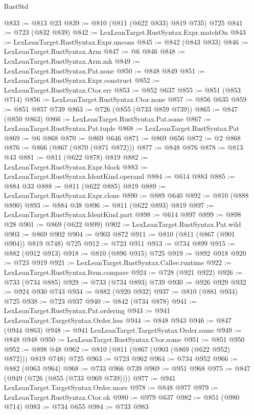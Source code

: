\begin{lexlean}{RustStd}
\begin{coremodule}
@833 := @813 @23
@839 := @810 (@811 (@622 @833) @819 @735) @725
@841 := @723 (@832 @839)
@842 := LexLeanTarget.RustSyntax.Expr.matchOn
@843 := LexLeanTarget.RustSyntax.Expr.uncons
@845 := @842 (@843 @833)
@846 := LexLeanTarget.RustSyntax.Arm
@847 := @6 @846
@848 := LexLeanTarget.RustSyntax.Arm.mk
@849 := LexLeanTarget.RustSyntax.Pat.none
@850 := @848 @849
@851 := LexLeanTarget.RustSyntax.Expr.construct
@852 := LexLeanTarget.RustSyntax.Ctor.err
@853 := @852 @637
@855 := @851 (@853 @714)
@856 := LexLeanTarget.RustSyntax.Ctor.none
@857 := @856 @635
@859 := @851 @857 @739
@863 := @726 (@855 (@733 @859 @739))
@865 := @847 (@850 @863)
@866 := LexLeanTarget.RustSyntax.Pat.some
@867 := LexLeanTarget.RustSyntax.Pat.tuple
@868 := LexLeanTarget.RustSyntax.Pat
@869 := @6 @868
@870 := @869 @646
@871 := @869 @656
@872 := @2 @868
@876 := @866 (@867 (@870 (@871 @872)))
@877 := @848 @876
@878 := @813 @43
@881 := @811 (@622 @878) @819
@882 := LexLeanTarget.RustSyntax.Expr.block
@883 := LexLeanTarget.RustSyntax.IdentKind.operand
@884 := @614 @883
@885 := @884 @33
@888 := @811 (@622 @885) @819
@889 := LexLeanTarget.RustSyntax.Expr.clone
@890 := @889 @640
@892 := @810 (@888 @890)
@893 := @884 @38
@896 := @811 (@622 @893) @819
@897 := LexLeanTarget.RustSyntax.IdentKind.part
@898 := @614 @897
@899 := @898 @28
@901 := @869 (@622 @899)
@902 := LexLeanTarget.RustSyntax.Pat.wild
@903 := @869 @902
@904 := @903 @872
@911 := @810 (@811 (@867 (@901 @904)) @819 @748) @725
@912 := @723 @911
@913 := @734 @899
@915 := @882 (@912 @913)
@918 := @810 (@896 @915) @725
@919 := @892 @918
@920 := @723 @919
@921 := LexLeanTarget.RustSyntax.Callee.runtime
@922 := LexLeanTarget.RustSyntax.Item.compare
@924 := @728 (@921 @922)
@926 := @733 (@734 @885)
@929 := @733 (@734 @893) @739
@930 := @926 @929
@932 := @924 @930 @743
@934 := @882 (@920 @932)
@937 := @810 (@881 @934) @725
@938 := @723 @937
@940 := @842 (@734 @878)
@941 := LexLeanTarget.RustSyntax.Pat.ordering
@943 := @941 LexLeanTarget.TargetSyntax.Order.less
@944 := @848 @943
@946 := @847 (@944 @863)
@948 := @941 LexLeanTarget.TargetSyntax.Order.same
@949 := @848 @948
@950 := LexLeanTarget.RustSyntax.Ctor.some
@951 := @851 @950
@952 := @898 @48
@962 := @810 (@811 (@867 (@903 (@869 (@622 @952) @872))) @819 @748) @725
@963 := @723 @962
@964 := @734 @952
@966 := @882 (@963 @964)
@968 := @733 @966 @739
@969 := @951 @968
@975 := @847 (@949 (@726 (@855 (@733 @969 @739))))
@977 := @941 LexLeanTarget.TargetSyntax.Order.more
@978 := @848 @977
@979 := LexLeanTarget.RustSyntax.Ctor.ok
@980 := @979 @637
@982 := @851 (@980 @714)
@983 := @734 @655
@984 := @733 @983

\end{coremodule}
\end{lexlean}
